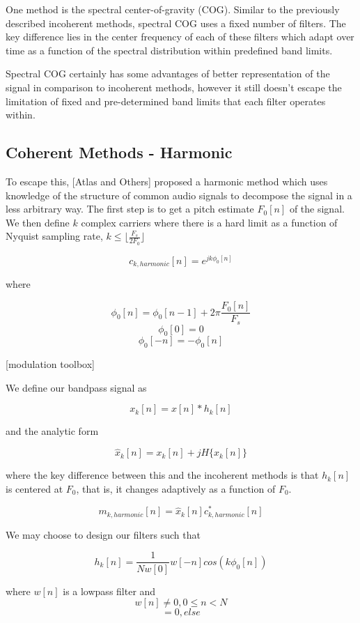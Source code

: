 \documentclass [11pt, proquest] {uwthesis}[2015/03/03]
\begin{document}
One method is the spectral center-of-gravity (COG).  Similar to the previously described incoherent methods, spectral COG uses a fixed number of filters.  The key difference lies in the center frequency of each of these filters which adapt over time as a function of the spectral distribution within predefined band limits.

Spectral COG certainly has some advantages of better representation of the signal in comparison to incoherent methods, however it still doesn't escape the limitation of fixed and pre-determined band limits that each filter operates within.

\subsection{Coherent Methods - Harmonic}

To escape this, [Atlas and Others] proposed a harmonic method which uses knowledge of the structure of common audio signals to decompose the signal in a less arbitrary way.  The first step is to get a pitch estimate $F_0[n]$ of the signal.  We then define $k$ complex carriers where there is a hard limit as a function of Nyquist sampling rate, $k \leq  \lfloor \frac{F_s}{2F_0} \rfloor$

$$c_{k,harmonic}[n] = e^{jk\phi_0 [n]}$$

where 

$$\phi_0[n] = \phi_0[n - 1] + 2\pi \frac{F_0[n]}{F_s}$$
$$\phi_0[0] = 0$$
$$\phi_0[-n] = -\phi_0[n]$$

[modulation toolbox]

We define our bandpass signal as 

$$x_k[n] = x[n] * h_k[n]$$

and the analytic form

$$\widehat{x}_k[n] = x_k[n] + jH\{x_k[n]\}$$

where the key difference between this and the incoherent methods is that $h_k[n]$ is centered at $F_0$, that is, it changes adaptively as a function of $F_0$.

$$m_{k,harmonic}[n] = \widehat{x}_k[n] c_{k,harmonic}^*[n] $$

We may choose to design our filters such that

$$h_k[n] = \frac{1}{Nw[0]} w[-n] cos( k \phi_0[n])$$

where $w[n]$ is a lowpass filter and 
$$w[n] \neq 0, 0 \leq n < N$$
$$ = 0, else$$
\end{document}
